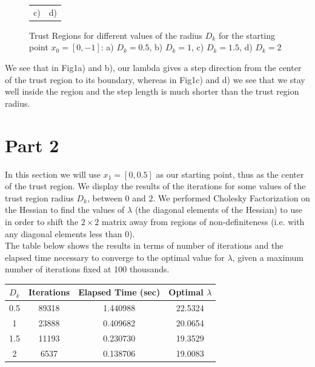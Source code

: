 \documentclass[a4paper,11pt]{article}
\begin{document}
\begin{figure}[!ht]
\begin{tabular}{cc}
		c) & d)\\
	\end{tabular}
	\caption{Trust Regions for different values of the radius $D_{k}$ for the starting point $x_{0}=[0,-1]$: a) $D_{k}=0.5$, b) $D_{k}=1$, c) $D_{k}=1.5$, d) $D_{k}=2$}
	\label{}
\end{figure}

We see that in Fig1a) and b), our lambda gives a step direction from the center of the trust region to its boundary, whereas in Fig1c) and d) we see that we stay well inside the region and the step length is much shorter than the trust region radius.

\section*{Part 2}
In this section we will use $x_{1}=[0, 0.5]$ as our starting point, thus as the center of the trust region. We display the results of the iterations for some values of the trust region radius $D_{k}$, between $0$ and $2$.
We performed Cholesky Factorization on the Hessian to find the values of $\lambda$ (the diagonal elements of the Hessian) to use in order to shift the $2\times{2}$ matrix away from regions of non-definiteness (i.e. with any diagonal elements less than 0).\\
The table below shows the results in terms of number of iterations and the elapsed time necessary to converge to the optimal value for $\lambda$, given a maximum number of iterations fixed at 100 thousands.

\begin{center}
	\begin{tabular}{||c | c | c | c|||} 
		\hline
		$D_{k}$ & Iterations & Elapsed Time (sec) & Optimal $\lambda$ \\ [0.5ex] 
		\hline\hline
		0.5 & 89318 & 1.440988 & 22.5324\\ 
		\hline
		1 & 23888 & 0.409682 & 20.0654\\
		\hline
		1.5 & 11193 & 0.230730 & 19.3529\\
		\hline
		2 & 6537 & 0.138706 & 19.0083\\
		\hline
	\end{tabular}
\end{center}
\end{document}
